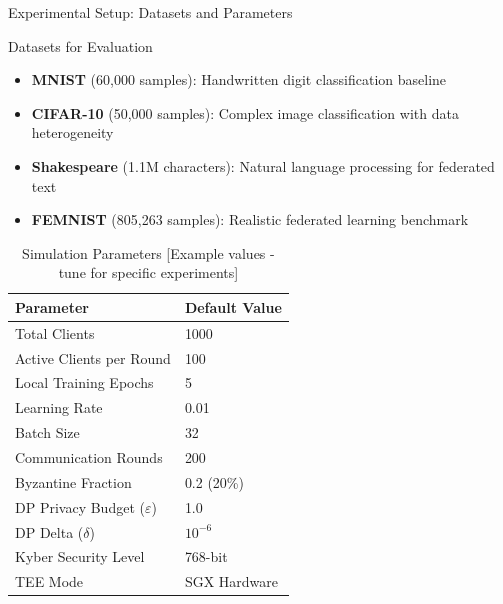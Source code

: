 \documentclass[aspectratio=169,11pt]{beamer}
\begin{document}
\begin{frame}{Experimental Setup: Datasets and Parameters}

\begin{block}{Datasets for Evaluation}
\begin{itemize}
\item \textbf{MNIST} (60,000 samples): Handwritten digit classification baseline
\item \textbf{CIFAR-10} (50,000 samples): Complex image classification with data heterogeneity
\item \textbf{Shakespeare} (1.1M characters): Natural language processing for federated text
\item \textbf{FEMNIST} (805,263 samples): Realistic federated learning benchmark
\end{itemize}
\end{block}

\begin{table}[h]
\centering
\footnotesize
\caption{Simulation Parameters [Example values - tune for specific experiments]}
\begin{tabular}{@{}ll@{}}
\toprule
\textbf{Parameter} & \textbf{Default Value} \\
\midrule
Total Clients & 1000 \\
Active Clients per Round & 100 \\
Local Training Epochs & 5 \\
Learning Rate & 0.01 \\
Batch Size & 32 \\
Communication Rounds & 200 \\
Byzantine Fraction & 0.2 (20\%) \\
DP Privacy Budget ($\varepsilon$) & 1.0 \\
DP Delta ($\delta$) & $10^{-6}$ \\
Kyber Security Level & 768-bit \\
TEE Mode & SGX Hardware \\
\bottomrule
\end{tabular}
\end{table}

\end{frame}
\end{document}
